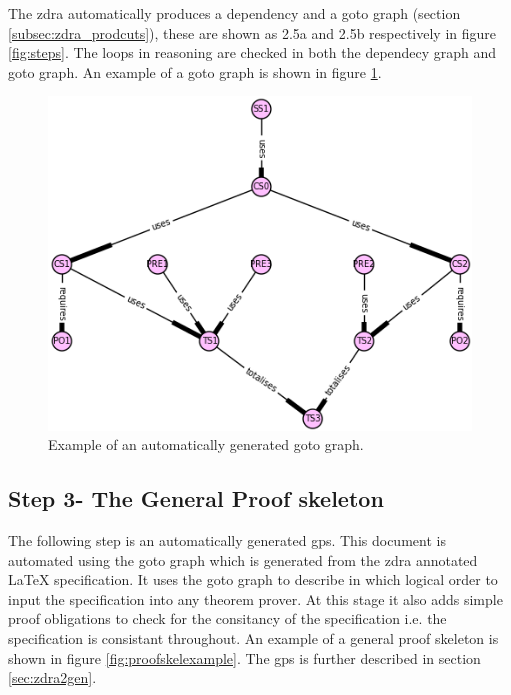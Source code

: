 The \gls{zdra} automatically produces a dependency and a goto graph (section
\ref{subsec:zdra_prodcuts}), these are shown as 2.5a and 2.5b respectively in
figure \ref{fig:steps}. The loops in reasoning are checked in both the dependecy
graph and goto graph. An example of a goto graph is shown in figure
\ref{fig:gotoexamplee}.

\begin{figure}[H]
 \begin{center}
 \includegraphics [scale=0.4]{Figures/Design/goto.png}
 \caption{Example of an automatically generated goto graph.}
 \label{fig:gotoexamplee}
\end{center}
\end{figure} 

\subsection{Step 3- The General Proof skeleton}

The following step is an automatically generated \gls{gps}. This document is
automated using the goto graph which is generated from the \gls{zdra} annotated
\LaTeX{} specification. It uses the goto graph to describe in which logical
order to input the specification into any theorem prover. At this stage it also
adds simple proof obligations to check for the consitancy of the specification
i.e. the specification is consistant throughout. An example of a general proof
skeleton is shown in figure \ref{fig:proofskelexample}. The \gls{gps} is further
described in section \ref{sec:zdra2gen}.

